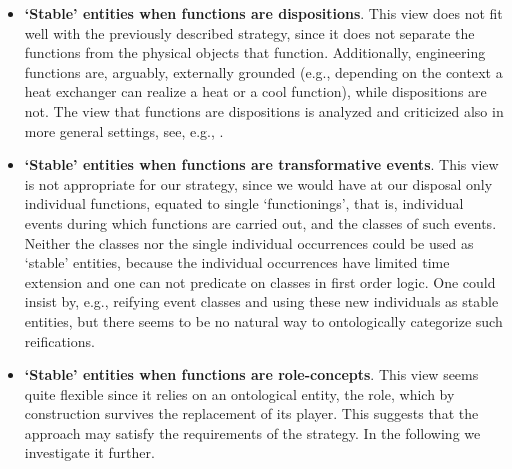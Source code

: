 \documentclass[
]{ceurart}
\begin{document}
\begin{itemize}
  \item \textbf{`Stable' entities when functions are dispositions}. This view does not fit well with the previously described strategy, since it does not separate the functions from the physical objects that function. Additionally, engineering functions are, arguably, externally grounded (e.g., depending on the context a heat exchanger can realize a heat or a cool function), while dispositions are not. The view that functions are dispositions is analyzed and criticized also in more general settings, see, e.g., \cite{rohlWhyFunctionsAre2014}. %
  \item \textbf{`Stable' entities when functions are transformative events}. %
   This view is not appropriate  %
   for our strategy, since we would have at our disposal only individual functions, equated to single `functionings', that is, individual events during which functions are carried out, and the classes of such events. Neither the classes nor the single individual occurrences could be used as `stable' entities, because the individual occurrences have limited time extension and one can not predicate on classes in first order logic.
   One could insist by, e.g., reifying event classes and using these new individuals as stable entities, but there seems to be no natural way to ontologically categorize such reifications. 
  \item \textbf{`Stable' entities when functions are role-concepts}. This view seems quite flexible since it relies on an ontological entity, the role, which by construction survives the replacement of its player. This suggests that the approach may satisfy the requirements of the strategy. In the following we investigate it further.
\end{itemize}
\end{document}
